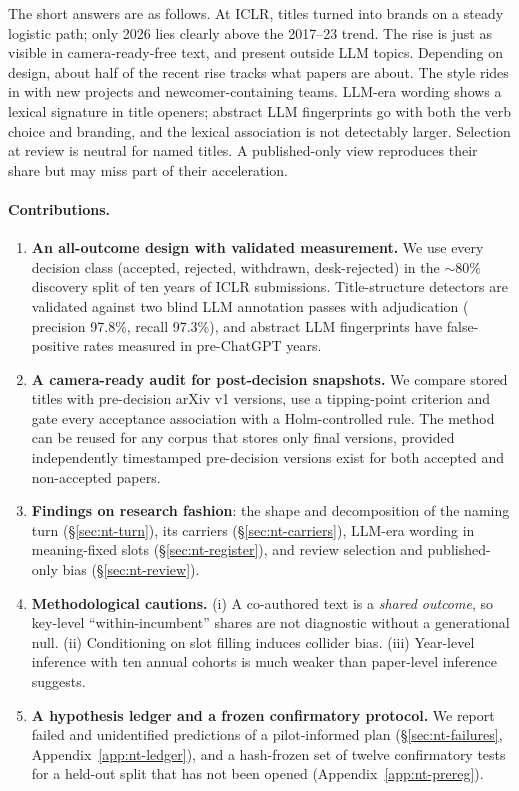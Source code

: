 The short answers are as follows. At ICLR, titles turned into brands on a steady logistic path; only 2026 lies clearly above the 2017--23 trend. The rise is just as visible in camera-ready-free text, and present outside LLM topics. Depending on design, about half of the recent rise tracks what papers are about. The style rides in with new projects and newcomer-containing teams. LLM-era wording shows a lexical signature in title openers; abstract LLM fingerprints go with both the verb choice and branding, and the lexical association is not detectably larger. Selection at review is neutral for named titles. A published-only view reproduces their share but may miss part of their acceleration.

\paragraph{Contributions.}
\begin{enumerate}
\item \textbf{An all-outcome design with validated measurement.} We use every decision class (accepted, rejected, withdrawn, desk-rejected) in the ${\sim}80\%$ discovery split of ten years of ICLR submissions. Title-structure detectors are validated against two blind LLM annotation passes with adjudication (\NAME{} precision 97.8\%, recall 97.3\%), and abstract LLM fingerprints have false-positive rates measured in pre-ChatGPT years.
\item \textbf{A camera-ready audit for post-decision snapshots.} We compare stored titles with pre-decision arXiv v1 versions, use a tipping-point criterion and gate every acceptance association with a Holm-controlled rule. The method can be reused for any corpus that stores only final versions, provided independently timestamped pre-decision versions exist for both accepted and non-accepted papers.
\item \textbf{Findings on research fashion}: the shape and decomposition of the naming turn (\S\ref{sec:nt-turn}), its carriers (\S\ref{sec:nt-carriers}), LLM-era wording in meaning-fixed slots (\S\ref{sec:nt-register}), and review selection and published-only bias (\S\ref{sec:nt-review}).
\item \textbf{Methodological cautions.} (i) A co-authored text is a \emph{shared outcome}, so key-level ``within-incumbent'' shares are not diagnostic without a generational null. (ii) Conditioning on slot filling induces collider bias. (iii) Year-level inference with ten annual cohorts is much weaker than paper-level inference suggests.
\item \textbf{A hypothesis ledger and a frozen confirmatory protocol.} We report failed and unidentified predictions of a pilot-informed plan (\S\ref{sec:nt-failures}, Appendix~\ref{app:nt-ledger}), and a hash-frozen set of twelve confirmatory tests for a held-out split that has not been opened (Appendix~\ref{app:nt-prereg}).
\end{enumerate}
